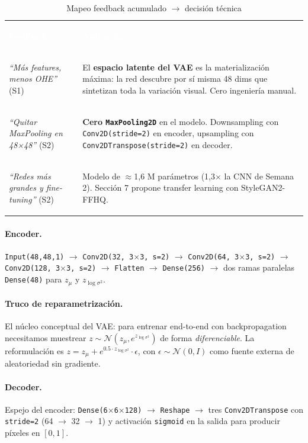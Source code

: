 \documentclass[10pt,a4paper,twocolumn]{article}
\begin{document}
\begin{table}[H]
\centering
\caption{Mapeo feedback acumulado $\rightarrow$ decisión técnica}
\label{tab:feedback}
\footnotesize
\renewcommand{\arraystretch}{1.25}
\begin{tabularx}{\columnwidth}{>{\bfseries\raggedright\arraybackslash}p{2.6cm} X}
\rowcolor{tableheader}\textcolor{white}{\textbf{Feedback}} & \textcolor{white}{\textbf{Aplicación}}\\
\textit{``Más features, menos OHE''} (S1) & El \textbf{espacio latente del VAE} es la materialización máxima: la red descubre por sí misma 48 dims que sintetizan toda la variación visual. Cero ingeniería manual.\\
\textit{``Quitar MaxPooling en 48×48''} (S2) & \textbf{Cero \texttt{MaxPooling2D}} en el modelo. Downsampling con \texttt{Conv2D(stride=2)} en encoder, upsampling con \texttt{Conv2DTranspose(stride=2)} en decoder.\\
\textit{``Redes más grandes y fine-tuning''} (S2) & Modelo de $\approx$1,6 M parámetros (1,3$\times$ la CNN de Semana 2). Sección 7 propone transfer learning con StyleGAN2-FFHQ.\\
\end{tabularx}
\end{table}

\paragraph{Encoder.} \texttt{Input(48,48,1)} $\rightarrow$ \texttt{Conv2D(32, 3$\times$3, s=2)} $\rightarrow$ \texttt{Conv2D(64, 3$\times$3, s=2)} $\rightarrow$ \texttt{Conv2D(128, 3$\times$3, s=2)} $\rightarrow$ \texttt{Flatten} $\rightarrow$ \texttt{Dense(256)} $\rightarrow$ dos ramas paralelas \texttt{Dense(48)} para $z_{\mu}$ y $z_{\log\sigma^2}$.

\paragraph{Truco de reparametrización.} El núcleo conceptual del VAE: para entrenar end-to-end con backpropagation necesitamos muestrear $z \sim \mathcal{N}(z_{\mu}, e^{z_{\log\sigma^2}})$ de forma \textit{diferenciable}. La reformulación es $z = z_{\mu} + e^{0.5 \cdot z_{\log\sigma^2}} \cdot \epsilon$, con $\epsilon \sim \mathcal{N}(0, I)$ como fuente externa de aleatoriedad sin gradiente.

\paragraph{Decoder.} Espejo del encoder: \texttt{Dense(6$\times$6$\times$128)} $\rightarrow$ \texttt{Reshape} $\rightarrow$ tres \texttt{Conv2DTranspose} con \texttt{stride=2} (64 $\rightarrow$ 32 $\rightarrow$ 1) y activación \texttt{sigmoid} en la salida para producir píxeles en $[0, 1]$.
\end{document}

